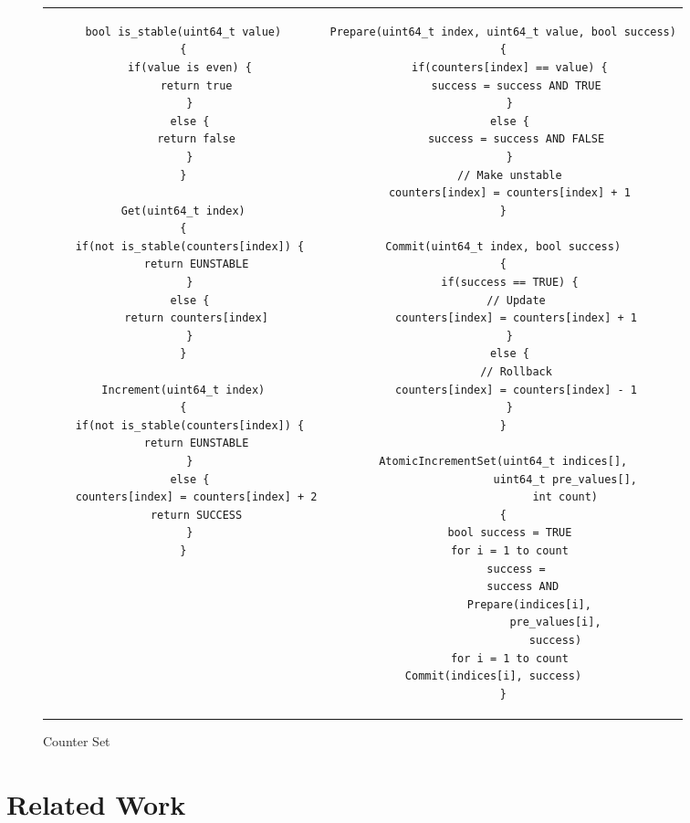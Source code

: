 \documentclass[twocolumn]{article}
\begin{document}
\begin{figure*}
\begin{tabular}{cc}    
\begin{minipage}{0.5\textwidth}  
{ \scriptsize
\begin{verbatim}
bool is_stable(uint64_t value)
{
  if(value is even) {
    return true
  }
  else {
    return false
  }
}

Get(uint64_t index)
{
  if(not is_stable(counters[index]) {
    return EUNSTABLE
  }
  else {
    return counters[index]
  }
}

Increment(uint64_t index)
{
  if(not is_stable(counters[index]) {
    return EUNSTABLE
  }
  else {
    counters[index] = counters[index] + 2
    return SUCCESS
  }
}
\end{verbatim}
}
\end{minipage} &
\begin{minipage}{0.5\textwidth}  
{ \scriptsize
\begin{verbatim}
Prepare(uint64_t index, uint64_t value, bool success)
{
  if(counters[index] == value) {
    success = success AND TRUE
  }
  else {
    success = success AND FALSE
  }
  // Make unstable
  counters[index] = counters[index] + 1
}

Commit(uint64_t index, bool success)
{
  if(success == TRUE) {
    // Update
    counters[index] = counters[index] + 1
  }
  else {
    // Rollback
    counters[index] = counters[index] - 1
  }
}

AtomicIncrementSet(uint64_t indices[],
                   uint64_t pre_values[],
                   int count)
{
  bool success = TRUE
  for i = 1 to count
    success =
      success AND
        Prepare(indices[i],
                pre_values[i],
                success)
  for i = 1 to count
    Commit(indices[i], success)       
}
\end{verbatim}
}
\end{minipage}
\end{tabular}
\caption{Counter Set}
\label{fig:counter_set}
\end{figure*}

\section{Related Work}
\end{document}
